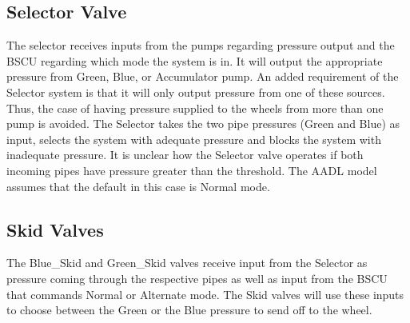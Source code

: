 \subsection{Selector Valve}
The selector receives inputs from the pumps regarding pressure output and the BSCU regarding which mode the system is in. It will output the appropriate pressure from Green, Blue, or Accumulator pump. An added requirement of the Selector system is that it will only output pressure from one of these sources. Thus, the case of having pressure supplied to the wheels from more than one pump is avoided. The Selector takes the two pipe pressures (Green and Blue) as input, selects the system with adequate pressure and blocks the system with inadequate pressure. It is unclear how the Selector valve operates if both incoming pipes have pressure greater than the threshold. The AADL model assumes that the default in this case is Normal mode. 

\subsection{Skid Valves}
The Blue_Skid and Green_Skid valves receive input from the Selector as pressure coming through the respective pipes as well as input from the BSCU that commands Normal or Alternate mode. The Skid valves will use these inputs to choose between the Green or the Blue pressure to send off to the wheel. 



